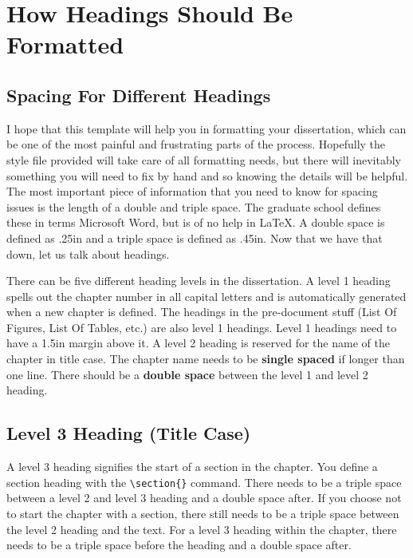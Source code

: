 \chapter{How Headings Should Be Formatted}

\section{Spacing For Different Headings}

I hope that this template will help you in formatting your dissertation, which can be one of the most painful and frustrating parts of the process. Hopefully the style file provided will take care of all formatting needs, but there will inevitably something you will need to fix by hand and so knowing the details will be helpful. The most important piece of information that you need to know for spacing issues is the length of a double and triple space. The graduate school defines these in terms Microsoft Word, but is of no help in \LaTeX. A double space is defined as .25in and a triple space is defined as .45in. Now that we have that down, let us talk about headings.

There can be five different heading levels in the dissertation. A level 1 heading spells out the chapter number in all capital letters and is automatically generated when a new chapter is defined. The headings in the pre-document stuff (List Of Figures, List Of Tables, etc.) are also level 1 headings. Level 1 headings need to have a 1.5in margin above it. A level 2 heading is reserved for the name of the chapter in title case. The chapter name needs to be \textbf{single spaced} if longer than one line. There should be a \textbf{double space} between the level 1 and level 2 heading.

\section{Level 3 Heading (Title Case)}
A level 3 heading signifies the start of a section in the chapter. You define a section heading with the \verb|\section{}| command. There needs to be a triple space between a level 2 and level 3 heading and a double space after. If you choose not to start the chapter with a section, there still needs to be a triple space between the level 2 heading and the text. For a level 3 heading within the chapter, there needs to be a triple space before the heading and a double space after.

